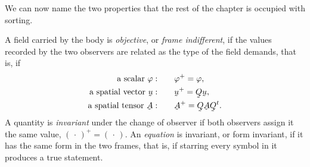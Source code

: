 We can now name the two properties that the rest of the chapter is
occupied with sorting.

\begin{definition}\label{def:ch7obj}
A field carried by the body is \emph{objective}, or \emph{frame
indifferent}, if the values recorded by the two observers are related as
the type of the field demands, that is, if
\[
\begin{aligned}
   \text{a scalar }\varphi:&\qquad \varphi^{+}=\varphi ,\\
   \text{a spatial vector }\bu:&\qquad \bu^{+}=\bQ\bu ,\\
   \text{a spatial tensor }\bA:&\qquad \bA^{+}=\bQ\bA\bQ^{t} .
\end{aligned}
\]
A quantity is \emph{invariant} under the change of observer if both
observers assign it the same value, $(\,\cdot\,)^{+}=(\,\cdot\,)$. An
\emph{equation} is invariant, or form invariant, if it has the same form
in the two frames, that is, if starring every symbol in it produces a
true statement.
\end{definition}


